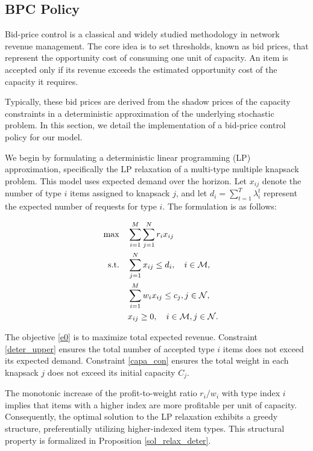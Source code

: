 \subsection{BPC Policy}
Bid-price control is a classical and widely studied methodology in network revenue management. The core idea is to set thresholds, known as bid prices, that represent the opportunity cost of consuming one unit of capacity. An item is accepted only if its revenue exceeds the estimated opportunity cost of the capacity it requires.

Typically, these bid prices are derived from the shadow prices of the capacity constraints in a deterministic approximation of the underlying stochastic problem. In this section, we detail the implementation of a bid-price control policy for our model.

We begin by formulating a deterministic linear programming (LP) approximation, specifically the LP relaxation of a multi-type multiple knapsack problem. This model uses expected demand over the horizon. Let $x_{ij}$ denote the number of type $i$ items assigned to knapsack $j$, and let $d_i = \sum_{t=1}^{T} \lambda^{t}_{i}$ represent the expected number of requests for type $i$. The formulation is as follows:


\begin{align}
\quad \max \quad & \sum_{i=1}^{M}  \sum_{j= 1}^{N} r_{i} x_{ij} \label{e0} \\
\text {s.t.} \quad & \sum_{j= 1}^{N} x_{ij} \leq d_{i}, \quad i \in \mathcal{M}, \label{deter_upper}\\ 
& \sum_{i=1}^{M} w_{i} x_{ij} \leq c_j, j \in \mathcal{N}, \label{capa_con} \\
& x_{ij} \geq 0, \quad i \in \mathcal{M}, j \in \mathcal{N}. \notag
\end{align}

The objective \eqref{e0} is to maximize total expected revenue. Constraint \eqref{deter_upper} ensures the total number of accepted type $i$ items does not exceed its expected demand. Constraint \eqref{capa_con} ensures the total weight in each knapsack $j$ does not exceed its initial capacity $C_j$.

The monotonic increase of the profit-to-weight ratio $r_i/w_i$ with type index $i$ implies that items with a higher index are more profitable per unit of capacity. Consequently, the optimal solution to the LP relaxation exhibits a greedy structure, preferentially utilizing higher-indexed item types. This structural property is formalized in Proposition \ref{sol_relax_deter}.

